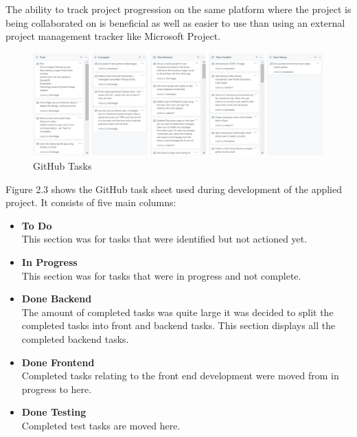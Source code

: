 \vspace{5mm} %

The ability to track project progression on the same platform where the project is being collaborated on is beneficial as well as easier to use than using an external project management tracker like Microsoft Project.

\vspace{5mm} %


\begin{figure}[ht]
    \centering
    \includegraphics[scale=0.50]{img/GitHubToDo.PNG}
    \caption{GitHub Tasks}
    \label{fig:my_label1}
\end{figure}


Figure 2.3 shows the GitHub task sheet used during development of the applied project. It consists of five main columns:

\begin{itemize}
\item \textbf{To Do}\\
This section was for tasks that were identified but not actioned yet.
\item \textbf{In Progress}\\
This section was for tasks that were in progress and not complete.
\item \textbf{Done Backend}\\
The amount of completed tasks was quite large it was decided to split the completed tasks into front and backend tasks. This section displays all the completed backend tasks.
\item \textbf{Done Frontend}\\
Completed tasks relating to the front end development were moved from in progress to here.
\item \textbf{Done Testing}\\
Completed test tasks are moved here.
\end{itemize}

\vspace{50mm} %

